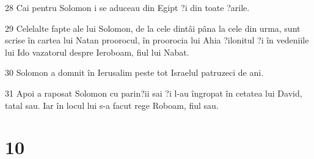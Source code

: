 \par 28 Cai pentru Solomon i se aduceau din Egipt ?i din toate ?arile.
\par 29 Celelalte fapte ale lui Solomon, de la cele dintâi pâna la cele din urma, sunt scrise în cartea lui Natan proorocul, în proorocia lui Ahia ?ilonitul ?i în vedeniile lui Ido vazatorul despre Ieroboam, fiul lui Nabat.
\par 30 Solomon a domnit în Ierusalim peste tot Israelul patruzeci de ani.
\par 31 Apoi a raposat Solomon cu parin?ii sai ?i l-au îngropat în cetatea lui David, tatal sau. Iar în locul lui s-a facut rege Roboam, fiul sau.

\chapter{10}

